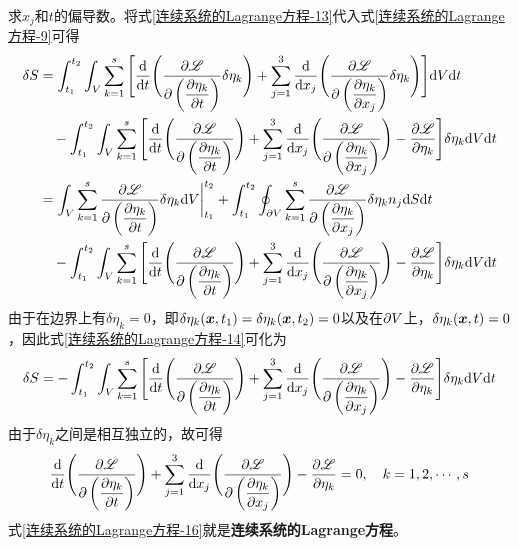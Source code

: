 求$x_j$和$t$的偏导数。将式\eqref{连续系统的Lagrange方程-13}代入式\eqref{连续系统的Lagrange方程-9}可得
\begin{align}
	\delta S & = \int_{t_1}^{t_2} \int_V \sum_{k=1}^s \Bigg[\frac{\mathrm{d}}{\mathrm{d}t} \Bigg(\frac{\partial \mathscr{L}}{\partial \left(\dfrac{\partial \eta_k}{\partial t}\right)} \delta \eta_k\Bigg) + \sum_{j=1}^3 \frac{\mathrm{d}}{\mathrm{d}x_j} \Bigg(\frac{\partial \mathscr{L}}{\partial \left(\dfrac{\partial \eta_k}{\partial x_j}\right)} \delta \eta_k\Bigg)\Bigg] \mathrm{d}V\mathrm{d}t \nonumber \\
	& \quad {}- \int_{t_1}^{t_2} \int_V \sum_{k=1}^s \Bigg[\frac{\mathrm{d}}{\mathrm{d}t} \Bigg(\frac{\partial \mathscr{L}}{\partial \left(\dfrac{\partial \eta_k}{\partial t}\right)}\Bigg) + \sum_{j=1}^3 \frac{\mathrm{d}}{\mathrm{d}x_j} \Bigg(\frac{\partial \mathscr{L}}{\partial \left(\dfrac{\partial \eta_k}{\partial x_j}\right)}\Bigg) - \frac{\partial \mathscr{L}}{\partial \eta_k}\Bigg] \delta \eta_k \mathrm{d}V\mathrm{d}t \nonumber \\
	& = \int_V \sum_{k=1}^s \frac{\partial \mathscr{L}}{\partial \left(\dfrac{\partial \eta_k}{\partial t}\right)} \delta \eta_k \mathrm{d}V \bigg|_{t_1}^{t_2} + \int_{t_1}^{t_2} \oint_{\partial V} \sum_{k=1}^s \frac{\partial \mathscr{L}}{\partial \left(\dfrac{\partial \eta_k}{\partial x_j}\right)} \delta \eta_k n_j \mathrm{d}S \mathrm{d}t \nonumber \\
	& \quad {}- \int_{t_1}^{t_2} \int_V \sum_{k=1}^s \Bigg[\frac{\mathrm{d}}{\mathrm{d}t} \Bigg(\frac{\partial \mathscr{L}}{\partial \left(\dfrac{\partial \eta_k}{\partial t}\right)}\Bigg) + \sum_{j=1}^3 \frac{\mathrm{d}}{\mathrm{d}x_j} \Bigg(\frac{\partial \mathscr{L}}{\partial \left(\dfrac{\partial \eta_k}{\partial x_j}\right)}\Bigg) - \frac{\partial \mathscr{L}}{\partial \eta_k}\Bigg] \delta \eta_k \mathrm{d}V\mathrm{d}t
	\label{连续系统的Lagrange方程-14}
\end{align}
由于在边界上有$\delta \eta_k = 0$，即$\delta\eta_k(\boldsymbol{x},t_1) = \delta\eta_k(\boldsymbol{x},t_2) = 0$以及在$\partial V$上，$\delta \eta_k(\boldsymbol{x},t) = 0$，因此式\eqref{连续系统的Lagrange方程-14}可化为
\begin{equation}
	\delta S = - \int_{t_1}^{t_2} \int_V \sum_{k=1}^s \Bigg[\frac{\mathrm{d}}{\mathrm{d}t} \Bigg(\frac{\partial \mathscr{L}}{\partial \left(\dfrac{\partial \eta_k}{\partial t}\right)}\Bigg) + \sum_{j=1}^3 \frac{\mathrm{d}}{\mathrm{d}x_j} \Bigg(\frac{\partial \mathscr{L}}{\partial \left(\dfrac{\partial \eta_k}{\partial x_j}\right)}\Bigg) - \frac{\partial \mathscr{L}}{\partial \eta_k}\Bigg] \delta \eta_k \mathrm{d}V\mathrm{d}t
	\label{连续系统的Lagrange方程-15}
\end{equation}
由于$\delta\eta_k$之间是相互独立的，故可得
\begin{equation}
	\frac{\mathrm{d}}{\mathrm{d}t} \Bigg(\frac{\partial \mathscr{L}}{\partial \left(\dfrac{\partial \eta_k}{\partial t}\right)}\Bigg) + \sum_{j=1}^3 \frac{\mathrm{d}}{\mathrm{d}x_j} \Bigg(\frac{\partial \mathscr{L}}{\partial \left(\dfrac{\partial \eta_k}{\partial x_j}\right)}\Bigg) - \frac{\partial \mathscr{L}}{\partial \eta_k} = 0,\quad k=1,2,\cdots,s
	\label{连续系统的Lagrange方程-16}
\end{equation}
式\eqref{连续系统的Lagrange方程-16}就是{\bf 连续系统的Lagrange方程}。

